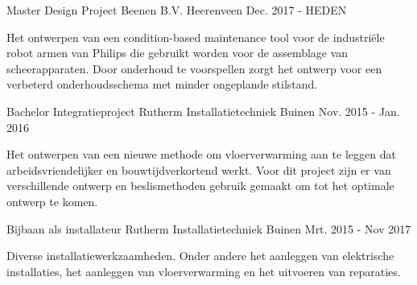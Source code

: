

\begin{cventries}

  \cventry
    {Master Design Project} %
    {Beenen B.V.} %
    {Heerenveen} %
    {Dec. 2017 - HEDEN} %
    {
      \begin{cvitems} %
        \item {Het ontwerpen van een condition-based maintenance tool voor de industriële robot armen van Philips die gebruikt worden voor de assemblage van scheerapparaten. Door onderhoud te voorspellen zorgt het ontwerp voor een verbeterd onderhoudsschema met minder ongeplande stilstand. }
      \end{cvitems}
    }
    
  \cventry
    {Bachelor Integratieproject} %
    {Rutherm Installatietechniek} %
    {Buinen} %
    {Nov. 2015 - Jan. 2016} %
    {
      \begin{cvitems} %
        \item {Het ontwerpen van een nieuwe methode om vloerverwarming aan te leggen dat arbeidsvriendelijker en bouwtijdverkortend werkt. Voor dit project zijn er van verschillende ontwerp en beslismethoden gebruik gemaakt om tot het optimale ontwerp te komen. }
      \end{cvitems}
    }

  \cventry
    {Bijbaan als installateur} %
    {Rutherm Installatietechniek} %
    {Buinen} %
    {Mrt. 2015 - Nov 2017} %
    {
      \begin{cvitems} %
        \item {Diverse installatiewerkzaamheden. Onder andere het aanleggen van elektrische installaties, het aanleggen van vloerverwarming en het uitvoeren van reparaties.}
      \end{cvitems}
    }


\end{cventries}
